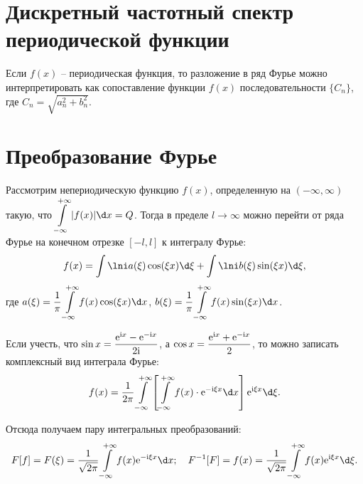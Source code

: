 \section{Дискретный частотный спектр периодической функции}
Если \( f(x) \) -- периодическая функция, то разложение в ряд Фурье можно
интерпретировать как сопоставление функции \( f(x) \) последовательности
\( \bigl\{ C_n \bigr\} \), где \( C_n = \sqrt{a_n^2 + b_n^2} \).

\section{Преобразование Фурье}
Рассмотрим непериодическую функцию \( f(x) \), определенную на \( (-\infty,
\infty) \) такую, что \( \ds \int\limits_{-\infty}^{+\infty} |f(x)|\d x = Q \).
Тогда в пределе \( l \to \infty \) можно перейти от ряда Фурье на конечном
отрезке \( [-l, l] \) к интегралу Фурье:
\[
    f(x) = \int\lni a(\xi)\cos(\xi x)\d\xi + \int\lni b(\xi)\sin(\xi x)\d\xi,
\]
где \( \ds a(\xi) = \frac{1}{\pi} \int\limits_{-\infty}^{+\infty}
f(x)\cos(\xi x)\d x \), \( \ds b(\xi) = \frac{1}{\pi}
\int\limits_{-\infty}^{+\infty} f(x)\sin(\xi x)\d x \).

Если учесть, что \( \displaystyle \sin x = \frac{\mathrm{e}^{\mathrm{i} x} - \mathrm{e}^{-\mathrm{i} x}}{2\mathrm{i}} \), а
\( \displaystyle \cos x = \frac{\mathrm{e}^{\mathrm{i} x} + \mathrm{e}^{-\mathrm{i} x}}{2} \), то можно записать
комплексный вид интеграла Фурье:
\[
    f(x) = \frac{1}{2\pi}\int\limits_{-\infty}^{+\infty} \left[
    \int\limits_{-\infty}^{+\infty} f(x)\cdot\e^{-\i\xi x}\d x\right]
    \e^{\i\xi x}\d\xi.
\]

Отсюда получаем пару интегральных преобразований:
\[
    F[f] = F(\xi) = \frac{1}{\sqrt{2\pi}}\int\limits_{-\infty}^{+\infty} f(x)
    \e^{-\i\xi x}\d x; \quad
    F^{-1}[F] = f(x) = \frac{1}{\sqrt{2\pi}}\int\limits_{-\infty}^{+\infty} f(x)
    \e^{\i\xi x}\d\xi.
\]
\newpage
